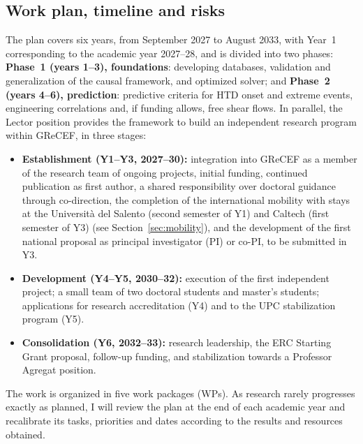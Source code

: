 \documentclass[11pt]{article}
\begin{document}
\subsection{Work plan, timeline and risks}\label{sec:workplan}
The plan covers six years, from September 2027 to August 2033, with Year~1 corresponding to the academic year 2027--28, and is divided into two phases: 
\textbf{Phase~1 (years 1--3), foundations}:
developing databases, validation and generalization of the causal framework, and optimized solver; 
and \textbf{Phase~2 (years 4--6), prediction}: predictive criteria for HTD onset and extreme events, engineering correlations and, if funding allows, free shear flows. 
In parallel, the Lector position provides the framework to build an independent research program within GReCEF, in three stages:
\begin{itemize}
  \item \textbf{Establishment (Y1--Y3, 2027--30):} integration into GReCEF as a member of the research team of ongoing projects, initial funding, continued publication as first author, a shared responsibility over doctoral guidance through co-direction, the completion of the international mobility with stays at the Università del Salento (second semester of Y1) and Caltech (first semester of Y3) (see Section~\ref{sec:mobility}), and the development of the first national proposal as principal investigator (PI) or co-PI, to be submitted in Y3.
  \item \textbf{Development (Y4--Y5, 2030--32):} execution of the first independent project; a small team of two doctoral students and master's students; applications for research accreditation (Y4) and to the UPC stabilization program (Y5).
  \item \textbf{Consolidation (Y6, 2032--33):} research leadership, the ERC Starting Grant
  proposal, follow-up funding, and stabilization towards a Professor Agregat position.
\end{itemize}
The work is organized in five work packages (WPs). As research rarely progresses exactly as planned, I will review the plan at the end of each academic year and recalibrate its tasks, priorities and dates according to the results and resources obtained.
\end{document}

